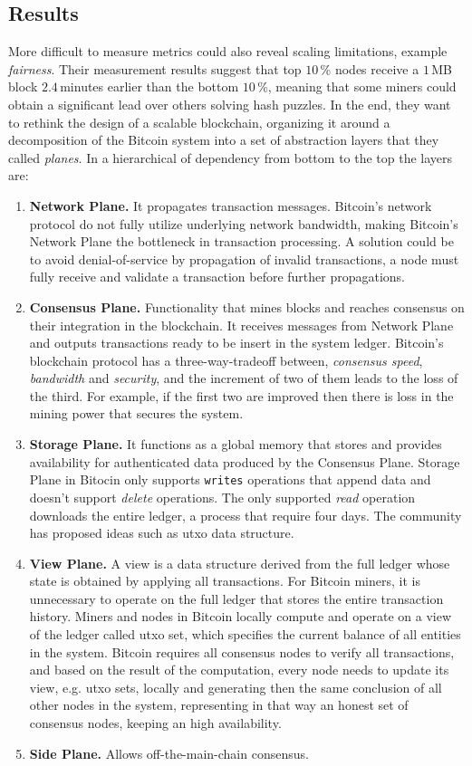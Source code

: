 \subsection{Results}
More difficult to measure metrics could also reveal scaling
limitations, example \emph{fairness}. Their measurement results
suggest that top $10$\,\% nodes receive a $1$\,MB block $2.4$\,minutes
earlier than the bottom $10$\,\%, meaning that some miners could
obtain a significant lead over others solving hash puzzles. In the end,
they want to rethink the design of a scalable blockchain, organizing
it around a decomposition of the Bitcoin system into a set of abstraction
layers that they called \emph{planes}. In a hierarchical of
dependency from bottom to the top the layers are:
\begin{enumerate}[noitemsep]
	\item \textbf{Network Plane.} It propagates transaction messages. Bitcoin's
	network protocol do not fully utilize underlying network bandwidth,
	making Bitcoin's Network Plane the bottleneck in transaction processing.
	A solution could be to avoid denial-of-service by propagation
	of invalid transactions, a node must fully receive and validate a transaction
	before further propagations.
	\item \textbf{Consensus Plane.} Functionality that mines
	blocks and reaches consensus on their integration
	in the blockchain. It receives
	messages from Network Plane and outputs transactions ready to be insert
	in the system ledger. Bitcoin's blockchain protocol has a three-way-tradeoff
	between, \emph{consensus speed}, \emph{bandwidth} and \emph{security}, and
	the increment of two of them leads to the loss of the third. For example,
	if the first two are improved then there is loss in the mining power
	that secures the system.
	\item \textbf{Storage Plane.} It functions as a global memory
	that stores and provides availability for authenticated data produced
	by the Consensus Plane. Storage Plane in Bitocin only supports
	\texttt{writes} operations that append data and doesn't support
	\emph{delete} operations. The only supported \emph{read} operation
	downloads the entire ledger, a process that require four days. The
	community has proposed ideas such as \gls{utxo} data structure.
	\item \textbf{View Plane.} A view is a data structure derived from the
	full ledger whose state is obtained by applying all transactions. For
	Bitcoin miners, it is unnecessary to operate on the full ledger that
	stores the entire transaction history. Miners and nodes in Bitcoin
	locally compute and operate on a view of the ledger called \gls{utxo} set,
	which specifies the current balance of all entities in the system.
	Bitcoin requires all consensus nodes to verify all transactions, and
	based on the result of the computation, every node needs to update its
	view, e.g. \gls{utxo} sets, locally and generating then the same conclusion
	of all other nodes in the system, representing in that way
	an honest set of consensus nodes, keeping an high availability.
	\item \textbf{Side Plane.} Allows off-the-main-chain consensus.
\end{enumerate}

